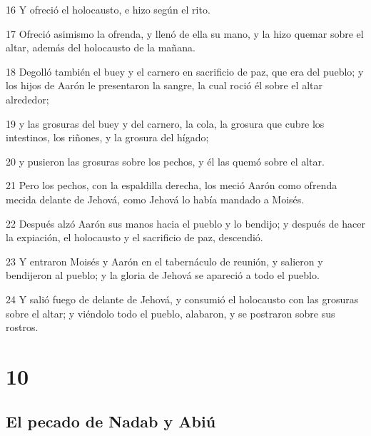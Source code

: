 \par 16 Y ofreció el holocausto, e hizo según el rito.
\par 17 Ofreció asimismo la ofrenda, y llenó de ella su mano, y la hizo quemar sobre el altar, además del holocausto de la mañana.
\par 18 Degolló también el buey y el carnero en sacrificio de paz, que era del pueblo; y los hijos de Aarón le presentaron la sangre, la cual roció él sobre el altar alrededor;
\par 19 y las grosuras del buey y del carnero, la cola, la grosura que cubre los intestinos, los riñones, y la grosura del hígado;
\par 20 y pusieron las grosuras sobre los pechos, y él las quemó sobre el altar.
\par 21 Pero los pechos, con la espaldilla derecha, los meció Aarón como ofrenda mecida delante de Jehová, como Jehová lo había mandado a Moisés.
\par 22 Después alzó Aarón sus manos hacia el pueblo y lo bendijo; y después de hacer la expiación, el holocausto y el sacrificio de paz, descendió.
\par 23 Y entraron Moisés y Aarón en el tabernáculo de reunión, y salieron y bendijeron al pueblo; y la gloria de Jehová se apareció a todo el pueblo.
\par 24 Y salió fuego de delante de Jehová, y consumió el holocausto con las grosuras sobre el altar; y viéndolo todo el pueblo, alabaron, y se postraron sobre sus rostros.

\chapter{10}

\section*{El pecado de Nadab y Abiú}

